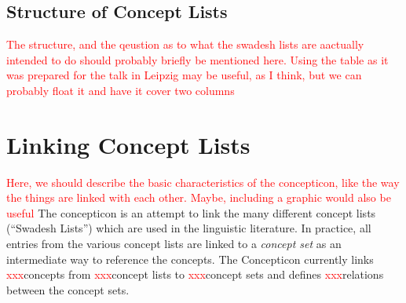 \documentclass[10pt, a4paper]{article}
\newcommand{\conceptnumber}{\textcolor{red}{xxx}}
\newcommand{\listnumber}{\textcolor{red}{xxx}}
\newcommand{\setnumber}{\textcolor{red}{xxx}}
\newcommand{\relationnumber}{\textcolor{red}{xxx}}
\begin{document}
\subsection{Structure of Concept Lists}
\textcolor{red}{The structure, and the qeustion as to what the swadesh lists are aactually intended
to do should probably briefly be mentioned here. Using the table as it was prepared for the talk in
Leipzig may be useful, as I think, but we can probably float it and have it cover two columns}

\section{Linking Concept Lists}
\textcolor{red}{Here, we should describe the basic characteristics of the concepticon, like the way
the things are linked with each other. Maybe, including a graphic would also be useful}
The concepticon is an attempt to link the many different concept lists (``Swadesh Lists'') which are
used in the linguistic literature. In practice, all entries from the various concept lists are
linked to a \emph{concept set} as an intermediate way to reference the concepts. The Concepticon
currently links \conceptnumber concepts from \listnumber concept lists to \setnumber concept sets
and defines \relationnumber relations between the concept sets.
 
\end{document}
